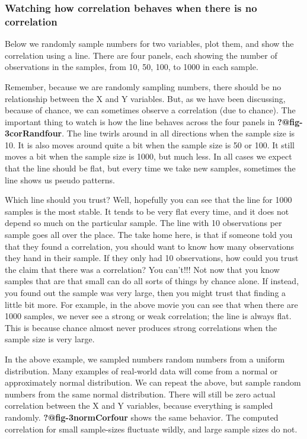 \documentclass[
  letterpaper,
  DIV=11,
  numbers=noendperiod]{scrreprt}
\begin{document}
\subsubsection{Watching how correlation behaves when there is no
correlation}\label{watching-how-correlation-behaves-when-there-is-no-correlation}

Below we randomly sample numbers for two variables, plot them, and show
the correlation using a line. There are four panels, each showing the
number of observations in the samples, from 10, 50, 100, to 1000 in each
sample.

Remember, because we are randomly sampling numbers, there should be no
relationship between the X and Y variables. But, as we have been
discussing, because of chance, we can sometimes observe a correlation
(due to chance). The important thing to watch is how the line behaves
across the four panels in \textbf{?@fig-3corRandfour}. The line twirls
around in all directions when the sample size is 10. It is also moves
around quite a bit when the sample size is 50 or 100. It still moves a
bit when the sample size is 1000, but much less. In all cases we expect
that the line should be flat, but every time we take new samples,
sometimes the line shows us pseudo patterns.

Which line should you trust? Well, hopefully you can see that the line
for 1000 samples is the most stable. It tends to be very flat every
time, and it does not depend so much on the particular sample. The line
with 10 observations per sample goes all over the place. The take home
here, is that if someone told you that they found a correlation, you
should want to know how many observations they hand in their sample. If
they only had 10 observations, how could you trust the claim that there
was a correlation? You can't!!! Not now that you know samples that are
that small can do all sorts of things by chance alone. If instead, you
found out the sample was very large, then you might trust that finding a
little bit more. For example, in the above movie you can see that when
there are 1000 samples, we never see a strong or weak correlation; the
line is always flat. This is because chance almost never produces strong
correlations when the sample size is very large.

In the above example, we sampled numbers random numbers from a uniform
distribution. Many examples of real-world data will come from a normal
or approximately normal distribution. We can repeat the above, but
sample random numbers from the same normal distribution. There will
still be zero actual correlation between the X and Y variables, because
everything is sampled randomly. \textbf{?@fig-3normCorfour} shows the
same behavior. The computed correlation for small sample-sizes fluctuate
wildly, and large sample sizes do not.
\end{document}
